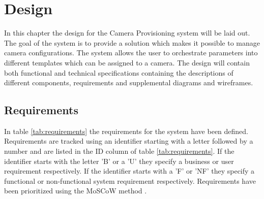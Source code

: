\chapter{Design}
\label{sec:design}
In this chapter the design for the Camera Provisioning system will be laid out.
The goal of the system is to provide a solution which makes it possible to manage camera configurations.
The system allows the user to orchestrate parameters into different templates which can be assigned to a camera.
The design will contain both functional and technical specifications containing the descriptions of different components, requirements and supplemental diagrams and wireframes.
\section{Requirements}
In table \ref{tab:requirements} the requirements for the system have been defined. Requirements are tracked using an identifier starting with a letter followed by a
number and are listed in the ID column of table \ref{tab:requirements}. If the identifier starts with the letter 'B' or a 'U' they specify a business or user requirement respectively. If the identifier starts with a 'F' or 'NF' they specify a functional or non-functional system requirement respectively.
Requirements have been prioritized using the MoSCoW method \cite{noauthor_moscow_nodate}.
